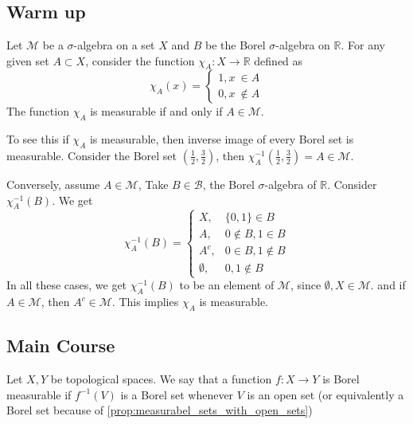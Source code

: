 
\chapter{}

\section{Warm up}
\begin{example}
  Let $\mathcal{M}$ be a $\sigma$-algebra on a set $X$ and $B$ be the Borel $\sigma$-algebra on $\mathbb{R}$. For any given set $A \subset X$, consider the function $\chi_A: X \to \mathbb{R}$ defined as \[
    \chi_A(x) = \begin{cases}
      1, x \  \in A \\
      0, x  \ \not \in A
    \end{cases}
  \]
  The function $\chi_A$ is measurable if and only if $A \in \mathcal{M}$.

  To see this if $  \chi_A$ is measurable, then inverse image of every Borel set is measurable. Consider the Borel set $( \frac{1}{2}, \frac{3}{2} )$, then $\chi_A^{-1}( \frac{1}{2}, \frac{3}{2} ) = A \in \mathcal{ M}$.

  Conversely, assume $A \in \mathcal{M}$, Take $B \in \mathcal{B}$, the Borel $\sigma$-algebra of $\mathbb{R}$. Consider $\chi_A^{-1}(B)$. We get \[
    \chi_A^{-1}(B) = \begin{cases}
      X, & \{ 0, 1 \} \in B \\ 
      A,  & 0 \not\in B, 1 \in B \\ 
      A^c, & 0 \in B, 1 \not \in B \\
      \emptyset, & 0,  1 \not \in B
    \end{cases}
  \]
    In all these cases, we get $\chi_A^{-1}(B)$ to be an element of $\mathcal{M}$, since $\emptyset, X \in \mathcal{M}$. and if $A \in \mathcal{M}$, then $A^c \in \mathcal{M}$. This implies $\chi_A$ is measurable.
\end{example}

\section{Main Course}

\begin{definition}
  Let $X, Y$ be topological spaces. We say that a function $f: X \to Y$ is Borel measurable if $f^{-1}(V)$ is a Borel set whenever $V$ is an open set (or equivalently a Borel set because of \autoref{prop:measurabel_sets_with_open_sets})
\end{definition}

